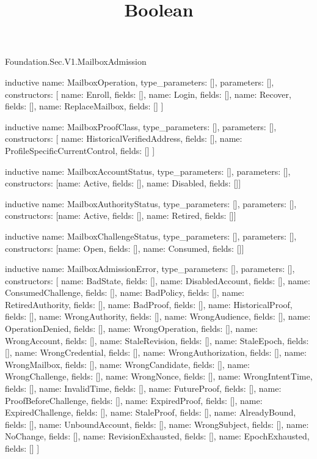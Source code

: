 \begin{lexlean}{Foundation.Sec.V1.MailboxAdmission}
\title{Boolean}
\begin{semanticmodule}
inductive{
  name: MailboxOperation,
  type_parameters: [],
  parameters: [],
  constructors: [
    {name: Enroll, fields: []},
    {name: Login, fields: []},
    {name: Recover, fields: []},
    {name: ReplaceMailbox, fields: []}
  ]
}

inductive{
  name: MailboxProofClass,
  type_parameters: [],
  parameters: [],
  constructors: [
    {name: HistoricalVerifiedAddress, fields: []},
    {name: ProfileSpecificCurrentControl, fields: []}
  ]
}

inductive{
  name: MailboxAccountStatus,
  type_parameters: [],
  parameters: [],
  constructors: [{name: Active, fields: []}, {name: Disabled, fields: []}]
}

inductive{
  name: MailboxAuthorityStatus,
  type_parameters: [],
  parameters: [],
  constructors: [{name: Active, fields: []}, {name: Retired, fields: []}]
}

inductive{
  name: MailboxChallengeStatus,
  type_parameters: [],
  parameters: [],
  constructors: [{name: Open, fields: []}, {name: Consumed, fields: []}]
}

inductive{
  name: MailboxAdmissionError,
  type_parameters: [],
  parameters: [],
  constructors: [
    {name: BadState, fields: []},
    {name: DisabledAccount, fields: []},
    {name: ConsumedChallenge, fields: []},
    {name: BadPolicy, fields: []},
    {name: RetiredAuthority, fields: []},
    {name: BadProof, fields: []},
    {name: HistoricalProof, fields: []},
    {name: WrongAuthority, fields: []},
    {name: WrongAudience, fields: []},
    {name: OperationDenied, fields: []},
    {name: WrongOperation, fields: []},
    {name: WrongAccount, fields: []},
    {name: StaleRevision, fields: []},
    {name: StaleEpoch, fields: []},
    {name: WrongCredential, fields: []},
    {name: WrongAuthorization, fields: []},
    {name: WrongMailbox, fields: []},
    {name: WrongCandidate, fields: []},
    {name: WrongChallenge, fields: []},
    {name: WrongNonce, fields: []},
    {name: WrongIntentTime, fields: []},
    {name: InvalidTime, fields: []},
    {name: FutureProof, fields: []},
    {name: ProofBeforeChallenge, fields: []},
    {name: ExpiredProof, fields: []},
    {name: ExpiredChallenge, fields: []},
    {name: StaleProof, fields: []},
    {name: AlreadyBound, fields: []},
    {name: UnboundAccount, fields: []},
    {name: WrongSubject, fields: []},
    {name: NoChange, fields: []},
    {name: RevisionExhausted, fields: []},
    {name: EpochExhausted, fields: []}
  ]
}


\end{semanticmodule}
\end{lexlean}
